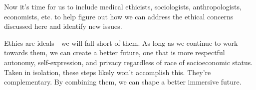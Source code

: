 Now it's time for us to include medical ethicists, sociologists, anthropologists, economists, etc. to help figure out how we can address the ethical concerns discussed here and identify new issues.

Ethics are ideals---we will fall short of them. As long as we continue to work towards them, we can create a better future, one that is more respectful autonomy, self-expression, and privacy regardless of race of socioeconomic status. Taken in isolation, these steps likely won't accomplish this. They're complementary. By combining them, we can shape a better immersive future.